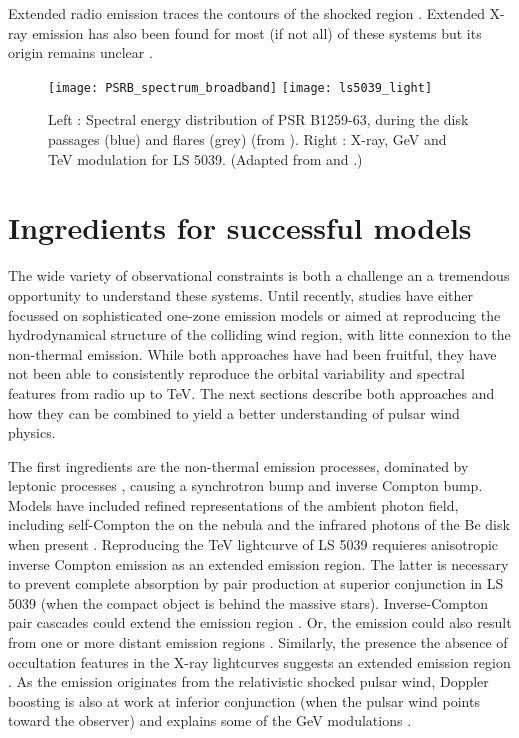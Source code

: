Extended radio emission traces the contours of the shocked region \citep{2006smqw.confE..52D,2011ApJ...732L..10M}. Extended X-ray emission has also been found for most (if not all) of these systems but its origin remains unclear  \citep{2014AN....335..301K}. 


\begin{figure}
  \centering
  \texttt{[image: PSRB\_spectrum\_broadband]}
\texttt{[image: ls5039\_light]}
  \caption{Left : Spectral energy distribution of PSR B1259-63, during the disk passages (blue) and flares (grey) (from \citet{2015MNRAS.454.1358C} ). Right : X-ray, GeV and TeV modulation for LS 5039. (Adapted from \citet{2009ApJ...697L...1K,2009ApJ...706L..56A} and \citet{2006A&A...460..743A} .)}
  \label{fig:obs}
\end{figure}


\section { Ingredients for successful models}


The wide variety of observational constraints is both a challenge an a tremendous opportunity to understand these systems.  Until recently, studies have either focussed on sophisticated one-zone emission models or aimed at reproducing the hydrodynamical  structure of the colliding wind region, with litte connexion to the non-thermal emission. While both approaches have had been fruitful, they have not been able to consistently reproduce the  orbital variability and spectral features from radio up to TeV.   The next sections describe both approaches and how they can be combined to yield a better understanding of pulsar wind physics.

The first ingredients are the non-thermal emission processes, dominated by leptonic processes \citep{2006A&A...456..801D}, causing a synchrotron bump and inverse Compton bump.  Models have included refined  representations of the ambient photon field, including self-Compton the on the nebula  \citep{2010A&A...519A..81C} and the infrared photons of the  Be disk when present  \citep{2012MNRAS.426.3135V}. Reproducing the TeV lightcurve of LS 5039 requieres anisotropic inverse Compton emission  \citep{2008A&A...477..691D} as an extended emission region. The latter is necessary to prevent complete absorption by pair production at  superior conjunction in LS 5039 (when the compact object is behind the massive stars).  Inverse-Compton pair cascades could extend the emission region \citep{2006MNRAS.371.1737B,2010A&A...519A..81C}. Or, the  emission could also result from one or more  distant emission regions \citep{2013A&A...551A..17Z}.  Similarly, the presence the absence of occultation features in the X-ray lightcurves suggests an extended emission region \citep{2007A&A...473..545B,2011MNRAS.411..193S}.  As the emission originates from the relativistic shocked pulsar wind, Doppler boosting is also at work at inferior conjunction (when the pulsar wind points toward the observer) and explains some of the GeV modulations \citep{2010A&A...516A..18D}. 


